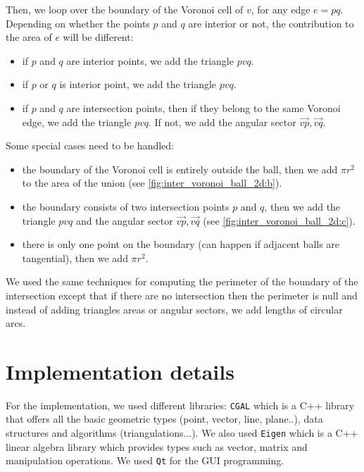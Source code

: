 Then, we loop over the boundary of the Voronoi cell of $ v $, for any edge $ e =
pq $. Depending on whether the points $ p $ and $ q $ are interior or not, the
contribution to the area of $ e $ will be different:
\begin{itemize}
    \item if $ p $ and $ q $ are interior points, we add the triangle $ pvq $.
    \item if $ p $ or $ q $ is interior point, we add the triangle $ pvq $.
    \item if $ p $ and $ q $ are intersection points, then if they belong to the
        same Voronoi edge, we add the triangle $ pvq $. If not, we add the
        angular sector $ \vec{vp}, \vec{vq} $.
\end{itemize}

Some special cases need to be handled:
\begin{itemize}
    \item the boundary of the Voronoi cell is entirely outside the ball, then we
        add $ \pi r^2 $ to the area of the union (see
        \ref{fig:inter_voronoi_ball_2d:b}).
    \item the boundary consists of two intersection points $ p $ and $ q $, then
        we add the triangle $ pvq $ and the angular sector $ \vec{vp}, \vec{vq}
        $ (see \ref{fig:inter_voronoi_ball_2d:c}).
    \item there is only one point on the boundary (can happen if adjacent balls
        are tangential), then we add $ \pi r^2 $.
\end{itemize}

We used the same techniques for computing the perimeter of the boundary of the
intersection except that if there are no intersection then the perimeter is null
and instead of adding triangles areas or angular sectors, we add lengths of
circular arcs.

\section{Implementation details}

For the implementation, we used different libraries: \texttt{CGAL} which is a
C++ library that offers all the basic geometric types (point, vector, line,
plane..), data structures and algorithms (triangulations...). We also used
\texttt{Eigen} which is a C++ linear algebra library which provides types such
as vector, matrix and manipulation operations. We used \texttt{Qt} for the GUI
programming.

